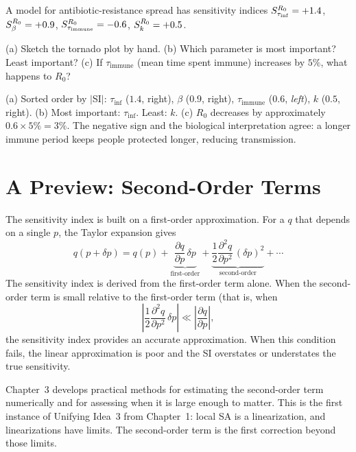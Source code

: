 \begin{selfcheck}
A model for antibiotic-resistance spread has sensitivity indices
$S_{\tau_{\mathrm{inf}}}^{R_0} = +1.4$,
$S_{\beta}^{R_0} = +0.9$,
$S_{\tau_{\mathrm{immune}}}^{R_0} = -0.6$,
$S_{k}^{R_0} = +0.5$.

(a) Sketch the tornado plot by hand.
(b) Which parameter is most important? Least important?
(c) If $\tau_{\mathrm{immune}}$ (mean time spent immune) increases by $5\%$,
    what happens to $R_0$?
\end{selfcheck}
\begin{scAnswer}
(a) Sorted order by $|$SI$|$: $\tau_{\mathrm{inf}}$ ($1.4$, right),
$\beta$ ($0.9$, right), $\tau_{\mathrm{immune}}$ ($0.6$, \textit{left}),
$k$ ($0.5$, right).
(b) Most important: $\tau_{\mathrm{inf}}$. Least: $k$.
(c) $R_0$ decreases by approximately $0.6 \times 5\% = 3\%$.
The negative sign and the biological interpretation agree: a longer
immune period keeps people protected longer, reducing transmission.
\end{scAnswer}

\section{A Preview: Second-Order Terms}
\label{sec:secondorder}

The sensitivity index is built on a first-order approximation.
For a \QOI $q$ that depends on a single \POI $p$, the Taylor expansion gives
\[
  q(p + \delta p) = q(p)
    + \underbrace{\frac{\partial q}{\partial p}\,\delta p}_{\text{first-order}}
    + \underbrace{\frac{1}{2}\frac{\partial^2 q}{\partial p^2}\,(\delta p)^2}_{\text{second-order}}
    + \cdots
\]
The sensitivity index is derived from the first-order term alone.
When the second-order term is small relative to the first-order term
(that is, when
\[
  \left|\frac{1}{2}\frac{\partial^2 q}{\partial p^2}\,\delta p\right|
  \ll \left|\frac{\partial q}{\partial p}\right|,
\]
the sensitivity index provides an accurate approximation.
When this condition fails, the linear approximation is poor
and the SI overstates or understates the true sensitivity.

Chapter~3 develops practical methods for estimating the second-order
term numerically and for assessing when it is large enough to matter.
This is the first instance of Unifying Idea~3 from Chapter~1:
local SA is a linearization, and linearizations have limits.
The second-order term is the first correction beyond those limits.

